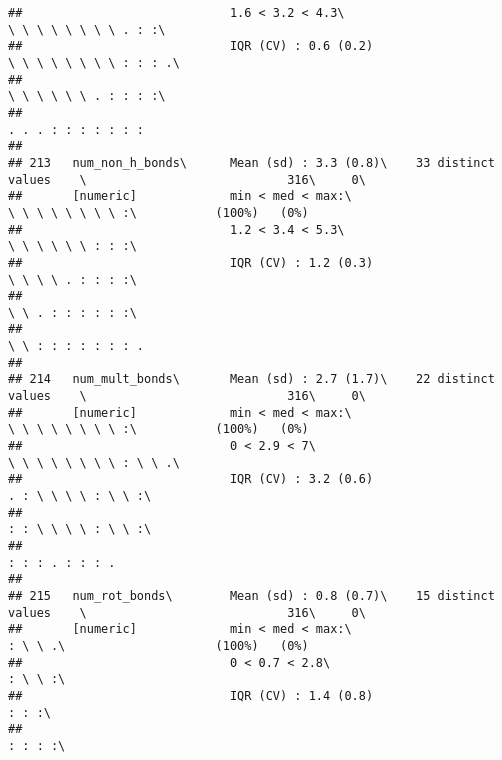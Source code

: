 \documentclass[]{article}
\begin{document}
\begin{verbatim}
##                             1.6 < 3.2 < 4.3\                                \ \ \ \ \ \ \ \ . : :\                         
##                             IQR (CV) : 0.6 (0.2)                            \ \ \ \ \ \ \ \ : : : .\                       
##                                                                             \ \ \ \ \ \ . : : : :\                         
##                                                                             . . . : : : : : : :                            
## 
## 213   num_non_h_bonds\      Mean (sd) : 3.3 (0.8)\    33 distinct values    \                            316\     0\       
##       [numeric]             min < med < max:\                               \ \ \ \ \ \ \ \ :\           (100%)   (0%)     
##                             1.2 < 3.4 < 5.3\                                \ \ \ \ \ \ : : :\                             
##                             IQR (CV) : 1.2 (0.3)                            \ \ \ \ . : : : :\                             
##                                                                             \ \ . : : : : : :\                             
##                                                                             \ \ : : : : : : : .                            
## 
## 214   num_mult_bonds\       Mean (sd) : 2.7 (1.7)\    22 distinct values    \                            316\     0\       
##       [numeric]             min < med < max:\                               \ \ \ \ \ \ \ \ :\           (100%)   (0%)     
##                             0 < 2.9 < 7\                                    \ \ \ \ \ \ \ \ : \ \ .\                       
##                             IQR (CV) : 3.2 (0.6)                            . : \ \ \ \ : \ \ :\                           
##                                                                             : : \ \ \ \ : \ \ :\                           
##                                                                             : : : . : : : .                                
## 
## 215   num_rot_bonds\        Mean (sd) : 0.8 (0.7)\    15 distinct values    \                            316\     0\       
##       [numeric]             min < med < max:\                               : \ \ .\                     (100%)   (0%)     
##                             0 < 0.7 < 2.8\                                  : \ \ :\                                       
##                             IQR (CV) : 1.4 (0.8)                            : : :\                                         
##                                                                             : : : :\                                       

\end{verbatim}
\end{document}
